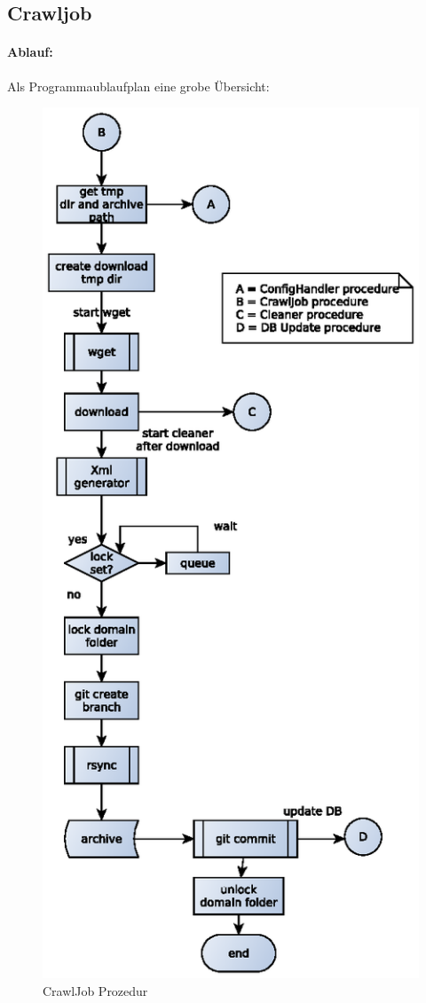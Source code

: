 \newpage
\subsection{Crawljob}
\label{sub:crawljob}
\paragraph{Ablauf:}
    Als Programmaublaufplan eine grobe Übersicht:
\label{par:ablauf_}
\begin{figure}[H]
	\centering
	\label{dia:design:backend:overview}
	\includegraphics[width=\textwidth]{design/backend/gfx/crawljob.eps}
	\caption{CrawlJob Prozedur}
\end{figure}


